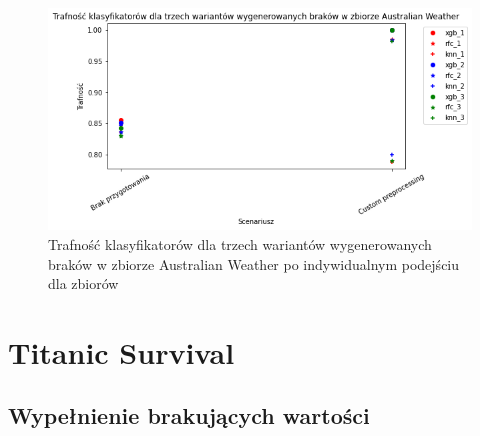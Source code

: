 \documentclass{book}
\begin{document}
    \begin{figure}[H]
    \centerline{\includegraphics[scale=0.8]{Aus_Weather_Custom}}
    \centering
    \caption{Trafność klasyfikatorów dla trzech wariantów wygenerowanych braków w zbiorze Australian Weather po indywidualnym podejściu dla zbiorów}
    \end{figure}

\section{Titanic Survival}



\subsection{Wypełnienie brakujących wartości}
\end{document}
